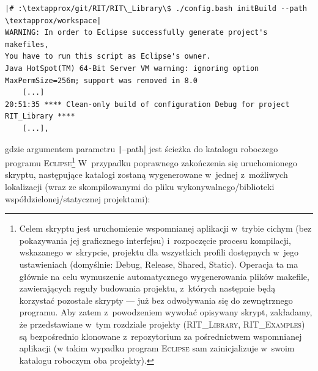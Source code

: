 \begin{verbatim}
|# :\textapprox/git/RIT/RIT\_Library\$ ./config.bash initBuild --path \textapprox/workspace|
WARNING: In order to Eclipse successfully generate project's makefiles, 
You have to run this script as Eclipse's owner.
Java HotSpot(TM) 64-Bit Server VM warning: ignoring option MaxPermSize=256m; support was removed in 8.0
	[...]
20:51:35 **** Clean-only build of configuration Debug for project RIT_Library ****
	[...],
\end{verbatim}
gdzie argumentem parametru \texttt|--path| jest ścieżka do katalogu roboczego programu \textsc{Eclipse}\footnote{Celem skryptu jest uruchomienie wspomnianej aplikacji w~trybie cichym (bez pokazywania jej graficznego interfejsu) i~rozpoczęcie procesu kompilacji, wskazanego w~skrypcie, projektu dla wszystkich profili dostępnych w~jego ustawieniach (domyślnie: \textsf{Debug}, \textsf{Release}, \textsf{Shared}, \textsf{Static}). Operacja ta ma głównie na celu wymuszenie automatycznego wygenerowania plików \textsf{makefile}, zawierających reguły budowania projektu, z~których następnie będą korzystać pozostałe skrypty --- już bez odwoływania się do zewnętrznego programu. Aby zatem z~powodzeniem wywołać opisywany skrypt, zakładamy, że przedstawiane w~tym rozdziale projekty (\textsc{RIT\_Library}, \textsc{RIT\_Examples}) są bezpośrednio klonowane z~repozytorium za pośrednictwem wspomnianej aplikacji (w takim wypadku program \textsc{Eclipse} sam zainicjalizuje w~swoim katalogu roboczym oba projekty).} W~przypadku poprawnego zakończenia się uruchomionego skryptu, następujące katalogi zostaną wygenerowane w~jednej z~możliwych lokalizacji (wraz ze skompilowanymi do pliku wykonywalnego/biblioteki współdzielonej/statycznej projektami):

